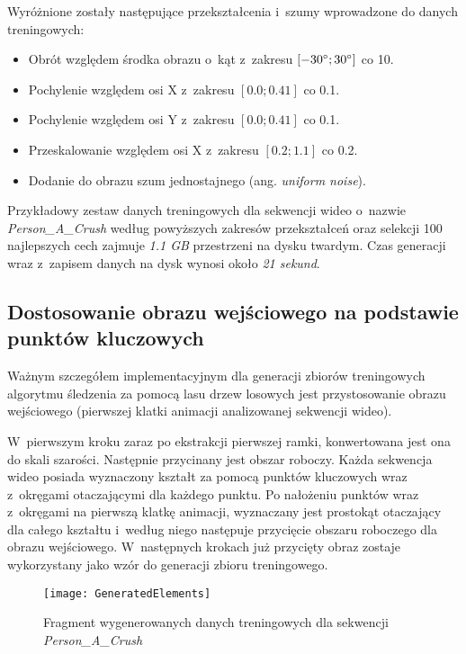   Wyróżnione zostały następujące przekształcenia i~szumy wprowadzone do danych treningowych:

  \begin{itemize}
    \item Obrót względem środka obrazu o~kąt z~zakresu $[-30^{\circ}\protect; 30^{\circ}\protect]$ co 10\degree.
    \item Pochylenie względem osi X z~zakresu $[0.0; 0.41]$ co 0.1.
    \item Pochylenie względem osi Y z~zakresu $[0.0; 0.41]$ co 0.1.
    \item Przeskalowanie względem osi X z~zakresu $[0.2; 1.1]$ co 0.2.
    \item Dodanie do obrazu szum jednostajnego (ang. \textit{uniform noise}).
  \end{itemize}

  Przykładowy zestaw danych treningowych dla sekwencji wideo o~nazwie \textit{Person\_A\_Crush} według powyższych zakresów przekształceń oraz selekcji 100 najlepszych cech zajmuje \textit{1.1 GB} przestrzeni na dysku twardym. Czas generacji wraz z~zapisem danych na dysk wynosi około \textit{21 sekund}.

  \subsection{Dostosowanie obrazu wejściowego na podstawie punktów kluczowych}\label{Subsection_AdjustFirstFrame}
  Ważnym szczegółem implementacyjnym dla generacji zbiorów treningowych algorytmu śledzenia za pomocą lasu drzew losowych jest przystosowanie obrazu wejściowego (pierwszej klatki animacji analizowanej sekwencji wideo).

  W~pierwszym kroku zaraz po ekstrakcji pierwszej ramki, konwertowana jest ona do skali szarości. Następnie przycinany jest obszar roboczy. Każda sekwencja wideo posiada wyznaczony kształt za pomocą punktów kluczowych wraz z~okręgami otaczającymi dla każdego punktu. Po nałożeniu punktów wraz z~okręgami na pierwszą klatkę animacji, wyznaczany jest prostokąt otaczający dla całego kształtu i~według niego następuje przycięcie obszaru roboczego dla obrazu wejściowego. W~następnych krokach już przycięty obraz zostaje wykorzystany jako wzór do generacji zbioru treningowego.

  \newpage

  \begin{figure}[!ht]
    \centering
    \texttt{[image: GeneratedElements]}
    \caption[Fragment wygenerowanych danych treningowych]{Fragment wygenerowanych danych treningowych dla sekwencji \\\textit{Person\_A\_Crush}}
    \label{fig:GeneratedElements}
  \end{figure}

